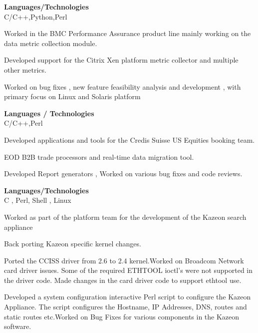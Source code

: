 \documentclass[a4,10pt]{cv4tw}
\begin{document}
{\textbf{Languages/Technologies} \\ C/C++,Python,Perl}
	{
	\begin{missions}
		\item Worked  in the BMC Performance Assurance product line mainly working on the data metric collection module.
		\item Developed support for the Citrix Xen platform metric collector and multiple other metrics.
		\item Worked  on bug fixes , new feature feasibility analysis and development , with primary focus on Linux and Solaris platform
	\end{missions}
}

{\textbf{Languages / Technologies } \\ C/C++,Perl}
	{
	\begin{missions}
		\item Developed applications and tools for the Credis Suisse US Equities booking team.
		\item EOD B2B trade processors and real-time data migration tool.
		\item Developed Report generators , Worked on various bug fixes and code reviews.
	\end{missions}
}

{\textbf{Languages/Technologies} \\ C , Perl, Shell , Linux}
	{
	\begin{missions}
		\item Worked as part of the platform team for the development of the Kazeon search appliance
		\item Back porting Kazeon specific kernel changes.
		\item Ported the CCISS driver from 2.6 to 2.4 kernel.Worked on Broadcom Network card driver issues. Some of the required ETHTOOL ioctl's were not supported in the driver code. Made changes in the card driver code to support ethtool use.
		\item Developed a  system configuration interactive Perl script to configure the Kazeon Appliance. The script configures the Hostname, IP Addresses, DNS, routes and static routes etc.Worked on Bug Fixes for various components in the Kazeon software.
	\end{missions}
}
\end{document}
